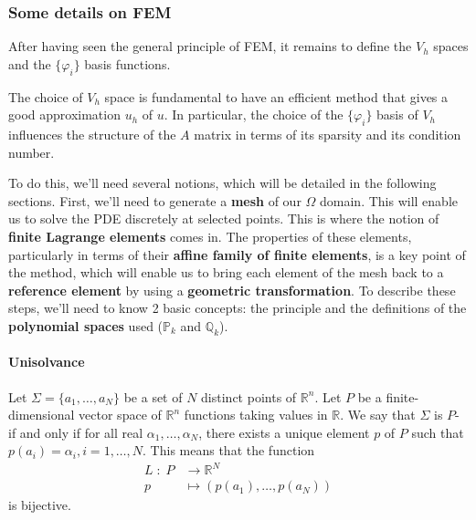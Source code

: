 \subsubsection{Some details on FEM}

After having seen the general principle of FEM, it remains to define the $V_h$ spaces and the $\{\varphi_i\}$ basis functions.

\begin{Rem}
	The choice of $V_h$ space is fundamental to have an efficient method that gives a good approximation $u_h$ of $u$. In particular, the choice of the $\{\varphi_i\}$ basis of $V_h$ influences the structure of the $A$ matrix in terms of its sparsity and its condition number.
\end{Rem}


To do this, we'll need several notions, which will be detailed in the following sections. First, we'll need to generate a \textbf{mesh} of our $\Omega$ domain. This will enable us to solve the PDE discretely at selected points. This is where the notion of \textbf{finite Lagrange elements} comes in. The properties of these elements, particularly in terms of their \textbf{affine family of finite elements}, is a key point of the method, which will enable us to bring each element of the mesh back to a \textbf{reference element} by using a \textbf{geometric transformation}. To describe these steps, we'll need to know 2 basic concepts: the \textbf{} principle and the definitions of the \textbf{polynomial spaces} used ($\mathbb{P}_k$ and $\mathbb{Q}_k$).


\paragraph{Unisolvance}

\begin{Def}
	Let $\Sigma=\{a_1,\dots,a_N\}$ be a set of $N$ distinct points of $\mathbb{R}^n$. Let $P$ be a finite-dimensional vector space of $\mathbb{R}^n$ functions taking values in $\mathbb{R}$. We say that $\Sigma$ is $P$- if and only if for all real $\alpha_1,\dots,\alpha_N$, there exists a unique element $p$ of $P$ such that $p(a_i)=\alpha_i,i=1,\dots,N$. 
	This means that the function
	\begin{align*}
		L \; : \; P &\rightarrow \mathbb{R}^N \\
		p &\mapsto(p(a_1),\dots,p(a_N))
	\end{align*}
	is bijective.
\end{Def}

